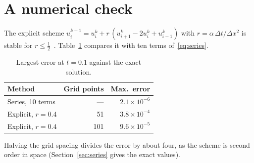 \documentclass[11pt]{article}
\begin{document}
\section{A numerical check}\label{sec:numerics}
The explicit scheme $u_i^{k+1} = u_i^k + r\,(u_{i+1}^k - 2u_i^k + u_{i-1}^k)$ with
$r = \alpha\,\Delta t / \Delta x^2$ is stable for $r \le \tfrac12$~\cite{crank1947}.
Table~\ref{tab:error} compares it with ten terms of~\eqref{eq:series}.

\begin{table}[ht]
  \centering
  \caption{Largest error at $t = 0.1$ against the exact solution.}
  \label{tab:error}
  \begin{tabular}{lrr}
    \toprule
    Method & Grid points & Max.\ error \\
    \midrule
    Series, 10 terms & --- & $2.1 \times 10^{-6}$ \\
    Explicit, $r = 0.4$ & 51 & $3.8 \times 10^{-4}$ \\
    Explicit, $r = 0.4$ & 101 & $9.6 \times 10^{-5}$ \\
    \bottomrule
  \end{tabular}
\end{table}

Halving the grid spacing divides the error by about four, as the scheme is second order in
space (Section~\ref{sec:series} gives the exact values).



\end{document}
